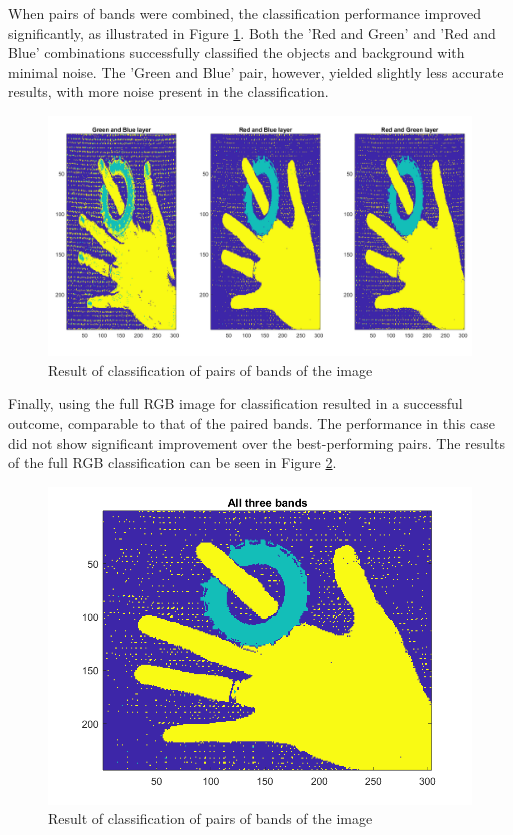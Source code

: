 \documentclass[12pt]{article}
\begin{document}
When pairs of bands were combined, the classification performance improved significantly, as illustrated in Figure \ref{fig:Q4_2}. Both the 'Red and Green' and 'Red and Blue' combinations successfully classified the objects and background with minimal noise. The 'Green and Blue' pair, however, yielded slightly less accurate results, with more noise present in the classification.
\begin{figure}[htbp!]
  \centering
  \includegraphics[width =\textwidth]{images/Q4_2b.png}
  \caption{Result of classification of pairs of bands of the image}
  \label{fig:Q4_2}
\end{figure}
Finally, using the full RGB image for classification resulted in a successful outcome, comparable to that of the paired bands. The performance in this case did not show significant improvement over the best-performing pairs. The results of the full RGB classification can be seen in Figure \ref{fig:Q4_3}.
\begin{figure}[htbp!]
  \centering
  \includegraphics[width = 15cm]{images/Q4_3b.png}
  \caption{Result of classification of pairs of bands of the image}
  \label{fig:Q4_3}
\end{figure}
\end{document}
